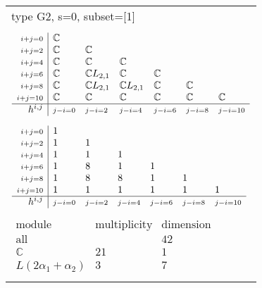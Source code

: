 \documentclass[crop,border=2mm]{standalone}
\begin{document}
\begin{tabular}{l}
{\huge type G2, s=0, subset=[1]}\\ \\


$\displaystyle
\begin{array}{r|l l l l l l}
	{\scriptstyle i+j=0}&\mathbb{C}&&&&&\\
	{\scriptstyle i+j=2}&\mathbb{C}&\mathbb{C}&&&&\\
	{\scriptstyle i+j=4}&\mathbb{C}&\mathbb{C}&\mathbb{C}&&&\\
	{\scriptstyle i+j=6}&\mathbb{C}&\mathbb{C}L_{2,1}&\mathbb{C}&\mathbb{C}&&\\
	{\scriptstyle i+j=8}&\mathbb{C}&\mathbb{C}L_{2,1}&\mathbb{C}L_{2,1}&\mathbb{C}&\mathbb{C}&\\
	{\scriptstyle i+j=10}&\mathbb{C}&\mathbb{C}&\mathbb{C}&\mathbb{C}&\mathbb{C}&\mathbb{C}\\
	\hline h^{i,j}&{\scriptstyle j-i=0}&{\scriptstyle j-i=2}&{\scriptstyle j-i=4}&{\scriptstyle j-i=6}&{\scriptstyle j-i=8}&{\scriptstyle j-i=10}
\end{array}
$ \\ \\


$\displaystyle
\begin{array}{r|l l l l l l}
	{\scriptstyle i+j=0}&1&&&&&\\
	{\scriptstyle i+j=2}&1&1&&&&\\
	{\scriptstyle i+j=4}&1&1&1&&&\\
	{\scriptstyle i+j=6}&1&8&1&1&&\\
	{\scriptstyle i+j=8}&1&8&8&1&1&\\
	{\scriptstyle i+j=10}&1&1&1&1&1&1\\
	\hline h^{i,j}&{\scriptstyle j-i=0}&{\scriptstyle j-i=2}&{\scriptstyle j-i=4}&{\scriptstyle j-i=6}&{\scriptstyle j-i=8}&{\scriptstyle j-i=10}
\end{array}
$ \\ \\


$\displaystyle
\begin{array}{rll}
	\text{module}&\text{multiplicity}&\text{dimension} \\ \hline \text{all}&&42 \\
	\mathbb{C}&21&1\\
	L\left( 2\alpha_{1}+\alpha_{2}\right)&3&7
\end{array}
$ \\ \\

\end{tabular}
\end{document}
